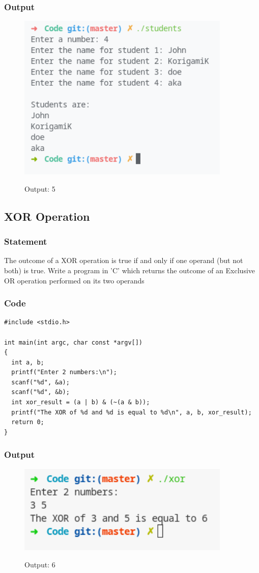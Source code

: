 \subsubsection{Output}
\begin{figure}[!htb]
  \centering
  \includegraphics[width=4in]{Images/student_names.png}
  \label{output:5}
  \caption{Output: 5}
\end{figure}

\pagebreak
\subsection{XOR Operation}

\subsubsection{Statement}
The outcome of a XOR operation is true if and only if one operand (but not both) is true. Write
a program in 'C' which returns the outcome of an Exclusive OR operation performed on its two
operands

\subsubsection{Code}
\begin{verbatim} 
#include <stdio.h>

int main(int argc, char const *argv[])
{
  int a, b;
  printf("Enter 2 numbers:\n");
  scanf("%d", &a);
  scanf("%d", &b);
  int xor_result = (a | b) & (~(a & b));
  printf("The XOR of %d and %d is equal to %d\n", a, b, xor_result);
  return 0;
}

\end{verbatim}
\subsubsection{Output}
\begin{figure}[!htb]
  \centering
  \includegraphics[width=4in]{Images/xor.png}
  \label{output:6}
  \caption{Output: 6}
\end{figure}


